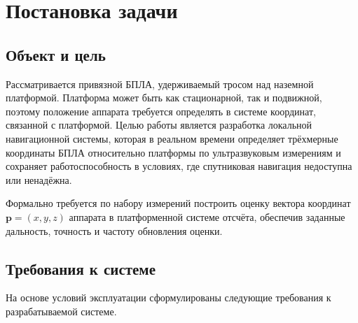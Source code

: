 \section{Постановка задачи}
\label{sec:Chapter1}

\subsection{Объект и цель}

Рассматривается привязной БПЛА, удерживаемый тросом над наземной платформой.
Платформа может быть как стационарной, так и подвижной, поэтому положение
аппарата требуется определять в системе координат, связанной с платформой.
Целью работы является разработка локальной навигационной системы, которая в
реальном времени определяет трёхмерные координаты БПЛА относительно платформы по
ультразвуковым измерениям и сохраняет работоспособность в условиях, где
спутниковая навигация недоступна или ненадёжна.

Формально требуется по набору измерений построить оценку вектора координат
$\mathbf{p}=(x,y,z)$ аппарата в платформенной системе отсчёта, обеспечив заданные
дальность, точность и частоту обновления оценки.

\subsection{Требования к системе}

На основе условий эксплуатации сформулированы следующие требования к
разрабатываемой системе.

